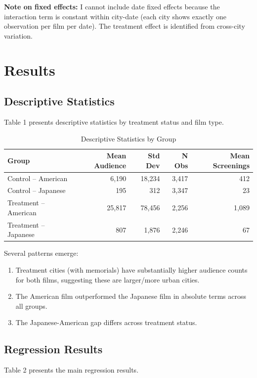 \documentclass[12pt]{article}
\begin{document}
\textbf{Note on fixed effects:} I cannot include date fixed effects because the interaction term is constant within city-date (each city shows exactly one observation per film per date). The treatment effect is identified from cross-city variation.

\section{Results}

\subsection{Descriptive Statistics}

Table 1 presents descriptive statistics by treatment status and film type.

\begin{table}[H]
\centering
\caption{Descriptive Statistics by Group}
\label{tab:desc}
\begin{tabular}{lrrrr}
\toprule
Group & Mean Audience & Std Dev & N Obs & Mean Screenings \\
\midrule
Control -- American & 6,190 & 18,234 & 3,417 & 412 \\
Control -- Japanese & 195 & 312 & 3,347 & 23 \\
Treatment -- American & 25,817 & 78,456 & 2,256 & 1,089 \\
Treatment -- Japanese & 807 & 1,876 & 2,246 & 67 \\
\bottomrule
\end{tabular}
\end{table}

Several patterns emerge:
\begin{enumerate}
\item Treatment cities (with memorials) have substantially higher audience counts for both films, suggesting these are larger/more urban cities.
\item The American film outperformed the Japanese film in absolute terms across all groups.
\item The Japanese-American gap differs across treatment status.
\end{enumerate}

\subsection{Regression Results}

Table 2 presents the main regression results.
\end{document}
